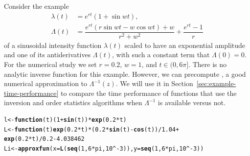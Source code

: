 \documentclass[article,nojss]{jss}\usepackage[]{graphicx}\usepackage[]{xcolor}
\makeatletter
\newcommand{\hlnum}[1]{\textcolor[rgb]{0.686,0.059,0.569}{#1}}%
\newcommand{\hlopt}[1]{\textcolor[rgb]{0,0,0}{#1}}%
\newcommand{\hlstd}[1]{\textcolor[rgb]{0.345,0.345,0.345}{#1}}%
\newcommand{\hlkwa}[1]{\textcolor[rgb]{0.161,0.373,0.58}{\textbf{#1}}}%
\newcommand{\hlkwb}[1]{\textcolor[rgb]{0.69,0.353,0.396}{#1}}%
\newcommand{\hlkwc}[1]{\textcolor[rgb]{0.333,0.667,0.333}{#1}}%
\newcommand{\hlkwd}[1]{\textcolor[rgb]{0.737,0.353,0.396}{\textbf{#1}}}%
\newenvironment{kframe}{%
 \def\at@end@of@kframe{}%
 \ifinner\ifhmode%
  \def\at@end@of@kframe{\end{minipage}}%
  \begin{minipage}{\columnwidth}%
 \fi\fi%
 \def\FrameCommand##1{\hskip\@totalleftmargin \hskip-\fboxsep
 \colorbox{shadecolor}{##1}\hskip-\fboxsep
     \hskip-\linewidth \hskip-\@totalleftmargin \hskip\columnwidth}%
 \MakeFramed {\advance\hsize-\width
   \@totalleftmargin\z@ \linewidth\hsize
   \@setminipage}}%
 {\par\unskip\endMakeFramed%
 \at@end@of@kframe}
\newenvironment{knitrout}{}{} %
\newcommand{\fct}[1]{\code{#1()}}
\makeatother
\begin{document}
Consider the example
\begin{equation}\label{eq:illustration}
\begin{aligned}
\lambda(t) &= e^{rt}(1+\sin wt), \\
\Lambda(t) &= \dfrac{e^{rt}(r\sin wt - w\cos wt) + w}{r^2+w^2}+\dfrac{e^{rt}-1}{r} %
\end{aligned}
\end{equation}
of a sinusoidal intensity function $\lambda(t)$ scaled to have an exponential amplitude and one of its antiderivatives $\Lambda(t)$, with such a constant term that $\Lambda(0)=0$.  For the numerical study we set $r=0.2$, $w=1$, and $t \in (0, 6\pi]$. There is no  analytic inverse function for this example.
However, we can precompute \fct{Li}, a good numerical approximation to $\Lambda^{-1}(z)$. We will use it in Section~\ref{sec:example-time-performance} to compare the time performance of functions that use the inversion and order statistics algorithms when $\Lambda^{-1}$ is available versus not.
\begin{knitrout}
\color{fgcolor}\begin{kframe}
\begin{alltt}
\hlstd{l} \hlkwb{<-} \hlkwa{function}\hlstd{(}\hlkwc{t}\hlstd{) (}\hlnum{1}\hlopt{+}\hlkwd{sin}\hlstd{(t))} \hlopt{*} \hlkwd{exp}\hlstd{(}\hlnum{0.2} \hlopt{*} \hlstd{t)}
\hlstd{L} \hlkwb{<-} \hlkwa{function}\hlstd{(}\hlkwc{t}\hlstd{)} \hlkwd{exp}\hlstd{(}\hlnum{0.2} \hlopt{*} \hlstd{t)} \hlopt{*} \hlstd{(}\hlnum{0.2} \hlopt{*} \hlkwd{sin}\hlstd{(t)} \hlopt{-}  \hlkwd{cos}\hlstd{(t))} \hlopt{/} \hlnum{1.04} \hlopt{+}
 \hlkwd{exp}\hlstd{(}\hlnum{0.2} \hlopt{*} \hlstd{t)} \hlopt{/} \hlnum{0.2} \hlopt{-} \hlnum{4.038462}
\hlstd{Li} \hlkwb{<-} \hlkwd{approxfun}\hlstd{(}\hlkwc{x} \hlstd{=} \hlkwd{L}\hlstd{(}\hlkwd{seq}\hlstd{(}\hlnum{1}\hlstd{,} \hlnum{6} \hlopt{*} \hlstd{pi,} \hlnum{10}\hlopt{^-}\hlnum{3}\hlstd{)),} \hlkwc{y} \hlstd{=} \hlkwd{seq}\hlstd{(}\hlnum{1}\hlstd{,} \hlnum{6} \hlopt{*} \hlstd{pi,} \hlnum{10}\hlopt{^-}\hlnum{3}\hlstd{))}
\end{alltt}
\end{kframe}
\end{knitrout}
\end{document}
